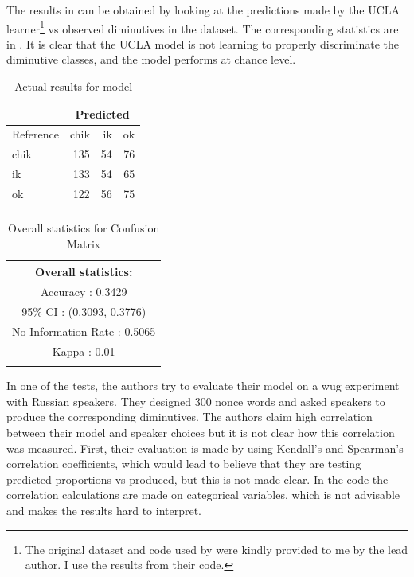 The results in  can be obtained by looking at the predictions made by the UCLA learner\footnote{The original dataset and code used by \textcite{Gouskova.2015} were kindly provided to me by the lead author. I use the results from their code.} vs observed diminutives in the dataset. The corresponding statistics are in . It is clear that the UCLA model is not learning to properly discriminate the diminutive classes, and the model performs at chance level.

\begin{table}
  \centering
  \begin{tabular}{lrrr}
    \lsptoprule
    & \multicolumn{3}{c}{Predicted} \\
    \midrule
    Reference & chik & ik & ok                \\
    chik      & 135  & 54 & 76                \\
    ik        & 133  & 54 & 65                \\
    ok        & 122  & 56 & 75                \\
    \lspbottomrule
  \end{tabular}
  \caption{Actual results for  model}\label{tab:test-gkn-model}
\end{table}

\begin{table}
  \centering
  \begin{tabular}{c}
    \lsptoprule
    Overall statistics:          \\
    \midrule
    Accuracy : 0.3429\\
    95\% CI : (0.3093, 0.3776)\\
    No Information Rate : 0.5065\\
    Kappa : 0.01\\
    \lspbottomrule
  \end{tabular}
  \caption{Overall statistics for Confusion Matrix }\label{tab:test-gkn-stats}
\end{table}

In one of the tests, the authors try to evaluate their model on a wug experiment with Russian speakers. They designed 300 nonce words and asked speakers to produce the corresponding diminutives. The authors claim high correlation between their model and speaker choices but it is not clear how this correlation was measured. First, their evaluation is made by using Kendall's and Spearman's correlation coefficients, which would lead to believe that they are testing predicted proportions vs produced, but this is not made clear. In the code the correlation calculations are made on categorical variables, which is not advisable and makes the results hard to interpret.

